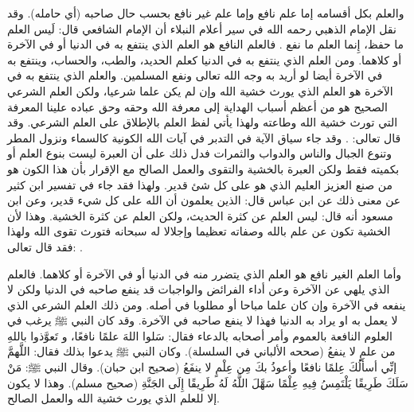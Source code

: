 والعلم بكل أقسامه إما علم نافع وإما علم غير نافع بحسب حال صاحبه (أي حامله). 
وقد نقل الإمام الذهبي رحمه الله في سير أعلام النبلاء أن الإمام الشافعي قال: لَيس العلم ما حفظ، إِنما العلم ما نفع \href{https://shamela.ws/book/22669/4503#p3}{\faExternalLink} \cite{dahabi_Siyar}. فالعلم النافع هو العلم الذي ينتفع به في الدنيا أو في الآخرة أو كلاهما. ومن العلم الذي ينتفع به في الدنيا كعلم الحديد، والطب، والحساب، وينتفع به في الآخرة أيضا لو أريد به وجه الله تعالى ونفع المسلمين. والعلم الذي ينتفع به في الآخرة هو العلم الذي يورث خشية الله وإن لم يكن علما شرعيا، ولكن العلم الشرعي الصحيح هو من أعظم أسباب الهداية إلى معرفة الله وحقه وحق عباده علينا المعرفة التي تورث خشية الله وطاعته ولهذا يأتي لفظ العلم بالإطلاق على العلم الشرعي. وقد قال تعالى: \quranayah*[35][28][8]{\footnotesize \surahname*[35]}. وقد جاء سياق الآية في التدبر في آيات الله الكونية كالسماء ونزول المطر وتنوع الجبال والناس والدواب والثمرات فدل ذلك على أن العبرة ليست بنوع العلم أو بكميته فقط ولكن العبرة بالخشية والتقوى والعمل الصالح مع الإقرار بأن هذا الكون هو من صنع العزيز العليم الذي هو على كل شئ قدير. ولهذا فقد جاء في تفسير ابن كثير عن معنى ذلك عن ابن عباس قال: الذين يعلمون أن الله على كل شيء قدير، وعن ابن مسعود أنه قال: ليس العلم عن كثرة الحديث، ولكن العلم عن كثرة الخشية. وهذا لأن الخشية تكون عن علم بالله وصفاته تعظيما وإجلالا له سبحانه فتورث تقوى الله ولهذا فقد قال تعالى: \quranayah*[24][52]{\footnotesize \surahname*[24]}.

وأما العلم الغير نافع هو العلم الذي يتضرر منه في الدنيا أو في الآخرة أو كلاهما. فالعلم الذي يلهي عن الآخرة وعن أداء الفرائض والواجبات قد ينفع صاحبه في الدنيا ولكن لا ينفعه في الآخرة وإن كان علما مباحا أو مطلوبا في أصله. ومن ذلك العلم الشرعي الذي لا يعمل به او يراد به الدنيا فهذا لا ينفع صاحبه في الآخرة. وقد كان النبي ﷺ يرغب في العلوم النافعة بالعموم وأمر أصحابه بالدعاء فقال: سَلوا اللهَ علمًا نافعًا، و تَعوَّذوا باللهِ من علمٍ لا ينفعُ {\footnotesize (صححه الألباني في السلسلة)}. وكان النبي ﷺ يدعوا بذلك فقال: اللَّهمَّ إنِّي أسأَلُكَ عِلمًا نافعًا وأعوذُ بكَ مِن عِلْمٍ لا ينفَعُ {\footnotesize (صحيح ابن حبان)}. وقال النبي ﷺ: مَنْ سَلَكَ طَرِيقًا يَلْتَمِسُ فِيهِ عِلْمًا سَهَّلَ اللَّهُ لَهُ طَرِيقًا إِلَى الجَنَّةِ {\footnotesize (صحيح مسلم)}. وهذا لا يكون إلا للعلم الذي يورث خشية الله والعمل الصالح.

